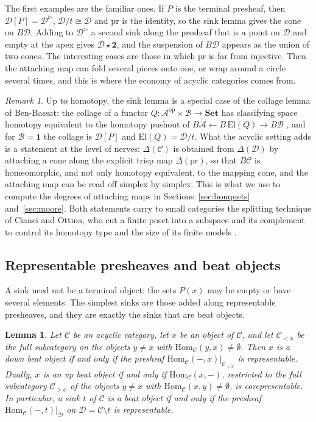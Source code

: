 \documentclass[12pt]{amsart}
\newtheorem{lemma}[teo]{Lemma}
\theoremstyle{definition}
\theoremstyle{remark}
\newtheorem{remark}[teo]{Remark}
\newcommand{\CC}{\mathcal{C}}
\newcommand{\DD}{\mathcal{D}}
\newcommand{\co}{\colon}
\newcommand{\Hom}{\mathrm{Hom}}
\newcommand{\op}{\mathrm{op}}
\newcommand{\nerve}{\Delta}
\begin{document}
The first examples are the familiar ones. If $P$ is the terminal presheaf, then $\DD[P]=\DD^{\triangleright}$, $\DD/t\cong\DD$ and $\mathrm{pr}$ is the identity, so the sink lemma gives the cone on $B\DD$. Adding to $\DD^{\triangleright}$ a second sink along the presheaf that is a point on $\DD$ and empty at the apex gives $\DD\star\mathbf 2$, and the suspension of $B\DD$ appears as the union of two cones. The interesting cases are those in which $\mathrm{pr}$ is far from injective. Then the attaching map can fold several pieces onto one, or wrap around a circle several times, and this is where the economy of acyclic categories comes from.

\begin{remark}\label{rem:collage}
Up to homotopy, the sink lemma is a special case of the collage lemma of Ben-Bassat: the collage of a functor $Q\co\mathcal A^{\op}\times\mathcal B\to\mathbf{Set}$ has classifying space homotopy equivalent to the homotopy pushout of $B\mathcal A\leftarrow B\,\mathrm{El}(Q)\to B\mathcal B$ \cite[Definition~2.3, Lemma~2.5]{BenBassat2026}, and for $\mathcal B=\mathbf 1$ the collage is $\DD[P]$ and $\mathrm{El}(Q)=\DD/t$. What the acyclic setting adds is a statement at the level of nerves: $\nerve(\CC)$ is obtained from $\nerve(\DD)$ by attaching a cone along the explicit trisp map $\nerve(\mathrm{pr})$, so that $B\CC$ is homeomorphic, and not only homotopy equivalent, to the mapping cone, and the attaching map can be read off simplex by simplex. This is what we use to compute the degrees of attaching maps in Sections~\ref{sec:bouquets} and~\ref{sec:moore}. Both statements carry to small categories the splitting technique of Cianci and Ottina, who cut a finite poset into a subspace and its complement to control its homotopy type and the size of its finite models \cite[Section~3]{CianciOttina2018}.
\end{remark}

\subsection{Representable presheaves and beat objects}\label{subsec:representable}

A sink need not be a terminal object: the sets $P(x)$ may be empty or have several elements. The simplest sinks are those added along representable presheaves, and they are exactly the sinks that are beat objects.

\begin{lemma}\label{lem:beat-representable}
Let $\CC$ be an acyclic category, let $x$ be an object of $\CC$, and let $\CC_{<x}$ be the full subcategory on the objects $y\neq x$ with $\Hom_\CC(y,x)\neq\emptyset$. Then $x$ is a down beat object if and only if the presheaf $\Hom_\CC(-,x)|_{\CC_{<x}}$ is representable. Dually, $x$ is an up beat object if and only if $\Hom_\CC(x,-)$, restricted to the full subcategory $\CC_{>x}$ of the objects $y\neq x$ with $\Hom_\CC(x,y)\neq\emptyset$, is corepresentable. In particular, a sink $t$ of $\CC$ is a beat object if and only if the presheaf $\Hom_\CC(-,t)|_\DD$ on $\DD=\CC\setminus t$ is representable.
\end{lemma}
\end{document}
